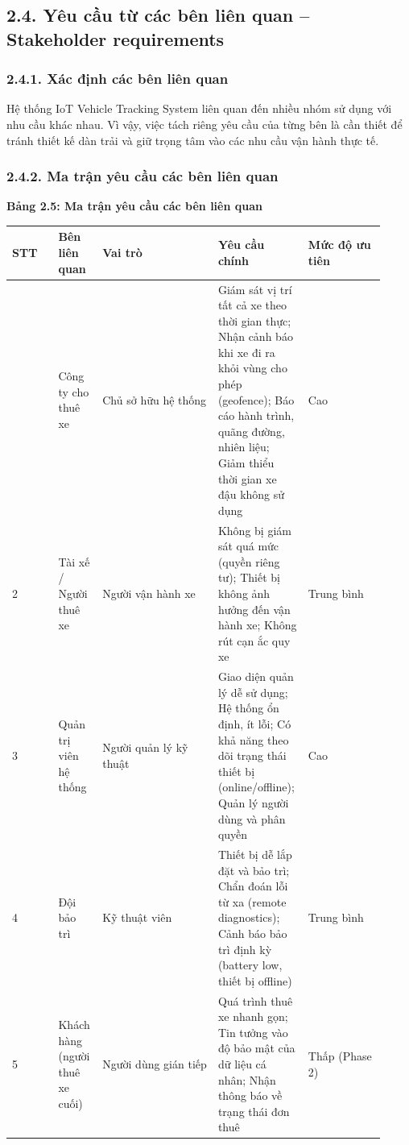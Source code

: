 \documentclass[13pt,a4paper]{extarticle}
\newcounter{none} %
\newcommand{\thesislongtableorignewline}{}
\let\thesislongtableorignewline\\
\renewcommand{\\}{\thesislongtableorignewline\hline}%
\let\\\thesislongtableorignewline
\newcommand{\thesistabletitle}[1]{%
  \begin{center}\textbf{#1}\end{center}%
}
\begin{document}
\subsection{2.4. Yêu cầu từ các bên liên quan -- Stakeholder
requirements}\label{24-yuxeau-cux1ea7u-tux1eeb-cuxe1c-buxean-liuxean-quan--stakeholder-requirements}

\subsubsection{2.4.1. Xác định các bên liên
quan}\label{241-xuxe1c-ux111ux1ecbnh-cuxe1c-buxean-liuxean-quan}

Hệ thống IoT Vehicle Tracking System liên quan đến nhiều nhóm sử dụng
với nhu cầu khác nhau. Vì vậy, việc tách riêng yêu cầu của từng bên là
cần thiết để tránh thiết kế dàn trải và giữ trọng tâm vào các nhu cầu
vận hành thực tế.

\subsubsection{2.4.2. Ma trận yêu cầu các bên liên
quan}\label{242-ma-trux1eadn-yuxeau-cux1ea7u-cuxe1c-buxean-liuxean-quan}

\thesistabletitle{Bảng 2.5: Ma trận yêu cầu các bên liên quan}

{\def\LTcaptype{none} %
\begin{longtable}{|p{0.12\linewidth}|p{0.10\linewidth}|p{0.30\linewidth}|p{0.20\linewidth}|p{0.20\linewidth}|}
\hline \textbf{STT} & \textbf{Bên liên quan} & \textbf{Vai trò} & \textbf{Yêu cầu chính} & \textbf{Mức độ ưu tiên} \\
\hline
\endhead
\hline
\endlastfoot
1 & Công ty cho thuê xe & Chủ sở hữu hệ thống & Giám sát vị trí tất cả
xe theo thời gian thực; Nhận cảnh báo khi xe đi ra khỏi vùng cho phép
(geofence); Báo cáo hành trình, quãng đường, nhiên liệu; Giảm thiểu thời
gian xe đậu không sử dụng & Cao \\
2 & Tài xế / Người thuê xe & Người vận hành xe & Không bị giám sát quá
mức (quyền riêng tư); Thiết bị không ảnh hưởng đến vận hành xe; Không
rút cạn ắc quy xe & Trung bình \\
3 & Quản trị viên hệ thống & Người quản lý kỹ thuật & Giao diện quản lý
dễ sử dụng; Hệ thống ổn định, ít lỗi; Có khả năng theo dõi trạng thái
thiết bị (online/offline); Quản lý người dùng và phân quyền & Cao \\
4 & Đội bảo trì & Kỹ thuật viên & Thiết bị dễ lắp đặt và bảo trì; Chẩn
đoán lỗi từ xa (remote diagnostics); Cảnh báo bảo trì định kỳ (battery
low, thiết bị offline) & Trung bình \\
5 & Khách hàng (người thuê xe cuối) & Người dùng gián tiếp & Quá trình
thuê xe nhanh gọn; Tin tưởng vào độ bảo mật của dữ liệu cá nhân; Nhận
thông báo về trạng thái đơn thuê & Thấp (Phase 2) \\
\end{longtable}
}
\end{document}

